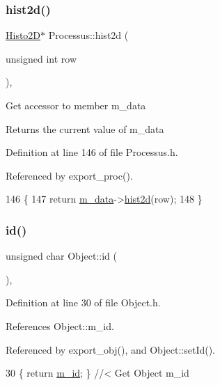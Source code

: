 \subsubsection{\texorpdfstring{hist2d()}{hist2d()}}
{\footnotesize\ttfamily \hyperlink{classHisto2D}{Histo2D}$\ast$ Processus\+::hist2d (\begin{DoxyParamCaption}\item[{unsigned int}]{row }\end{DoxyParamCaption})\hspace{0.3cm}{\ttfamily [inline]}, {\ttfamily [inherited]}}

Get accessor to member m\+\_\+data \begin{DoxyReturn}{Returns}
the current value of m\+\_\+data 
\end{DoxyReturn}


Definition at line 146 of file Processus.\+h.



Referenced by export\+\_\+proc().


\begin{DoxyCode}
146                                    \{
147     \textcolor{keywordflow}{return} \hyperlink{classProcessus_a3da9a9de8af54e2f47807a3e09dfccff}{m\_data}->\hyperlink{classData_ab717ebe242192605ad509b76df35e855}{hist2d}(row);
148   \}
\end{DoxyCode}
\mbox{\label{classObject_af99145335cc61ff6e2798ea17db009d2}} 
\subsubsection{\texorpdfstring{id()}{id()}}
{\footnotesize\ttfamily unsigned char Object\+::id (\begin{DoxyParamCaption}{ }\end{DoxyParamCaption})\hspace{0.3cm}{\ttfamily [inline]}, {\ttfamily [inherited]}}



Definition at line 30 of file Object.\+h.



References Object\+::m\+\_\+id.



Referenced by export\+\_\+obj(), and Object\+::set\+Id().


\begin{DoxyCode}
30 \{ \textcolor{keywordflow}{return} \hyperlink{classObject_aca74b9dbfed7b5556ea2d56c65b6b6b0}{m\_id};         \} \textcolor{comment}{//< Get Object m\_id }
\end{DoxyCode}
\mbox{\label{classProcessus_abe603d0636f76db6aa6c5c60cf34c591}} 
